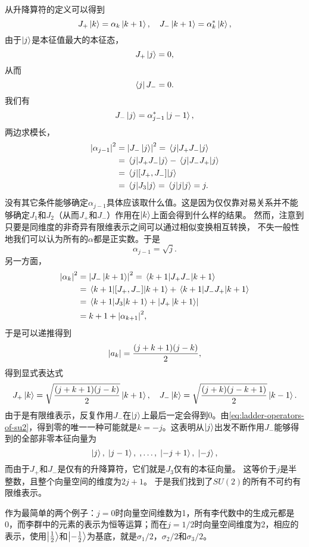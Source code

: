 \documentclass[hyperref, UTF8, a4paper]{ctexart}
\begin{document}
从升降算符的定义可以得到
\[
    J_+ \ket{k} = \alpha_k \ket{k+1}, \quad J_- \ket{k+1} = \alpha_k^* \ket{k},
\]
由于$\ket{j}$是本征值最大的本征态，
\[
    J_+ \ket{j} = 0,
\]
从而
\[
    \bra{j} J_- = 0.
\]
我们有
\[
    J_- \ket{j} = \alpha_{j-1}^* \ket{j-1},
\]
两边求模长，
\[
    \begin{aligned}
        \abs{\alpha_{j-1}}^2 &= \abs{J_- \ket{j}}^2 = \mel{j}{J_+ J_-}{j} \\
        &= \mel{j}{J_+ J_-}{j} - \mel{j}{J_- J_+}{j} \\
        &= \mel{j}{[J_+, J_-]}{j} \\
        &= \mel{j}{J_3}{j} = \mel{j}{j}{j} = j.
    \end{aligned}
\]
没有其它条件能够确定$\alpha_{j-1}$具体应该取什么值。这是因为仅仅靠对易关系并不能够确定$J_1$和$J_2$（从而$J_+$和$J_-$）作用在$\ket{k}$上面会得到什么样的结果。
然而，注意到只要是同维度的非奇异有限维表示之间可以通过相似变换相互转换，%
不失一般性地我们可以认为所有的$\alpha$都是正实数。于是
\[
    \alpha_{j-1} = \sqrt{j}.
\]
另一方面，
\[
    \begin{aligned}
        \abs{\alpha_k}^2 &= \abs{J_- \ket{k+1}}^2 = \mel{k+1}{J_+ J_-}{k+1} \\
        &= \mel{k+1}{[J_+, J_-]}{k+1} + \mel{k+1}{J_- J_+}{k+1} \\
        &= \mel{k+1}{J_3}{k+1} + \abs{J_+ \ket{k+1}} \\
        &= k+1 + \abs{\alpha_{k+1}}^2,
    \end{aligned} 
\]
于是可以递推得到
\[
    \abs{a_k} = \frac{(j+k+1)(j-k)}{2},
\]
得到显式表达式
\begin{equation}
    J_+ \ket{k} = \sqrt{\frac{(j+k+1)(j-k)}{2}} \ket{k+1}, \quad J_- \ket{k} = \sqrt{\frac{(j+k)(j-k+1)}{2}} \ket{k-1}.
    \label{eq:ladder-operators-of-su2}
\end{equation}
由于是有限维表示，反复作用$J_-$在$\ket{j}$上最后一定会得到$0$。由\eqref{eq:ladder-operators-of-su2}，得到零的唯一一种可能就是$k=-j$。这表明从$\ket{j}$出发不断作用$J_-$能够得到的全部非零本征向量为
\[
    \ket{j}, \; \ket{j-1}, \; , \ldots, \; \ket{-j+1}, \; \ket{-j},
\]
而由于$J_+$和$J_-$是仅有的升降算符，它们就是$J_3$仅有的本征向量。
这等价于$j$是半整数，且整个向量空间的维度为$2j+1$。
于是我们找到了$SU(2)$的所有不可约有限维表示。

作为最简单的两个例子：$j=0$时向量空间维数为1，所有李代数中的生成元都是0，而李群中的元素的表示为恒等运算；而在$j=1/2$时向量空间维度为2，相应的表示，使用$\ket{\frac{1}{2}}$和$\ket{-\frac{1}{2}}$为基底，就是$\sigma_1 / 2$，$\sigma_2 / 2$和$\sigma_3 / 2$。
\end{document}
